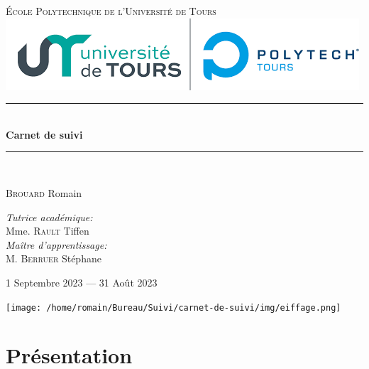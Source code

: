 \documentclass[12pt, openany]{report}
\newcommand{\HRule}{\rule{\linewidth}{0.5mm}}
\begin{document}
    \begin{titlepage}
        \begin{center}
            \textsc{\LARGE École Polytechnique de l'Université de Tours}
            \\[2cm]

            \includegraphics{img/polytech}
            \\[2cm]

            \HRule \\[0.4cm]
            { \huge \bfseries Carnet de suivi\\[0.4cm] }

            \HRule \\[2cm]

            \begin{minipage}{0.4\textwidth}
                \begin{flushleft} \large
\textsc{Brouard} Romain\\\end{flushleft}
            \end{minipage}
            \begin{minipage}{0.4\textwidth}
                \begin{flushright} \large
\emph{Tutrice académique:}\\ Mme. \textsc{Rault} Tiffen\\
\emph{Maître d'apprentissage:}\\ M. \textsc{Berruer} Stéphane\\
\end{flushright}
            \end{minipage}

            \vfill

            {\large 1\ier{} Septembre 2023 — 31 Août 2023}

\texttt{[image: /home/romain/Bureau/Suivi/carnet-de-suivi/img/eiffage.png]}


        \end{center}
    \end{titlepage}

    \setcounter{tocdepth}{1}
    \tableofcontents

    \chapter{Présentation}
\end{document}
